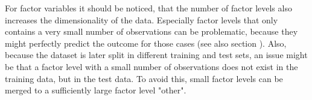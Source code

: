 For factor variables it should be noticed, that the number of factor levels also increases the dimensionality of the data. Especially factor levels that only contains a very small number of observations can be problematic, because they might perfectly predict the outcome for those cases (see also section ). Also, because the dataset is later split in different training and test sets, an issue might be that a factor level with a small number of observations does not exist in the training data, but in the test data. To avoid this, small factor levels can be merged to a sufficiently large factor level "other". 